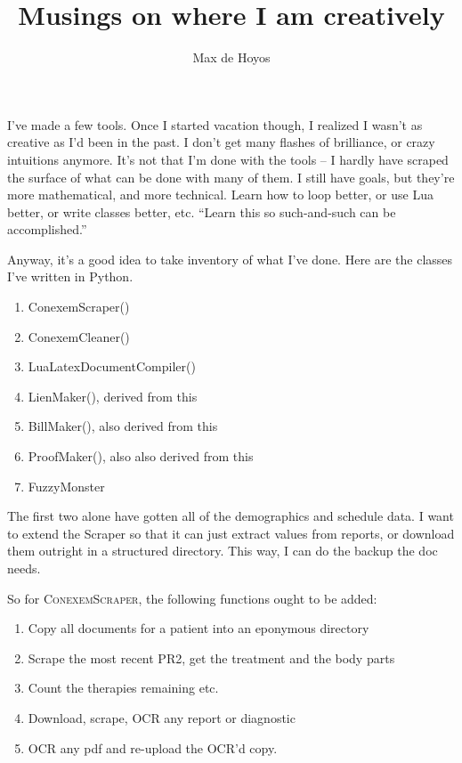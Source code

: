 \documentclass{article}
\author{Max de Hoyos}
\title{Musings on where I am creatively}
\begin{document}
\maketitle

I've made a few tools. Once I started vacation though, I realized I wasn't as creative as I'd been in the past. I don't get many flashes of brilliance, or crazy intuitions anymore. It's not that I'm done with the tools -- I hardly have scraped the surface of what can be done with many of them. I still have goals, but they're more mathematical, and more technical. Learn how to loop better, or use Lua better, or write classes better, etc. ``Learn this so such-and-such can be accomplished.''

Anyway, it's a good idea to take inventory of what I've done. Here are the classes I've written in Python.

\begin{enumerate}
	\item ConexemScraper()
	\item ConexemCleaner()
	\item LuaLatexDocumentCompiler()
	\item LienMaker(), derived from this
	\item BillMaker(), also derived from this
	\item ProofMaker(), also also derived from this
	\item FuzzyMonster
\end{enumerate}

The first two alone have gotten all of the demographics and schedule data. I want to extend the Scraper so that it can just extract values from reports, or download them outright in a structured directory. This way, I can do the backup the doc needs.

So for \textsc{ConexemScraper}, the following functions ought to be added:

\begin{enumerate}
	\item Copy all documents for a patient into an eponymous directory
	\item Scrape the most recent PR2, get the treatment and the body parts
	\item Count the therapies remaining etc.
	\item Download, scrape, OCR any report or diagnostic
	\item OCR any pdf and re-upload the OCR'd copy.
\end{enumerate}
\end{document}
